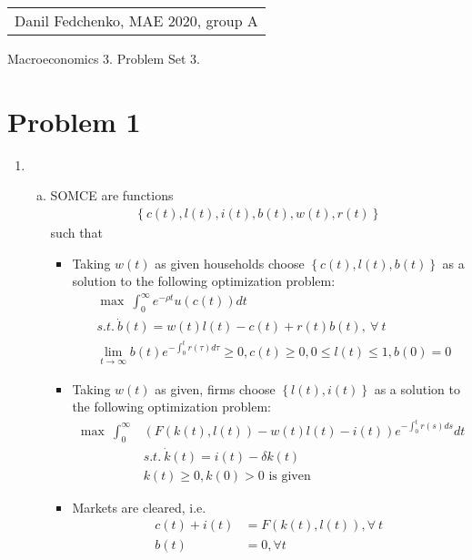 \documentclass[a4paper]{article}
\begin{document}
	\begin{flushright}
	\begin{tabular}{r}
		Danil Fedchenko, MAE 2020, group A \\
	\end{tabular}
\end{flushright}


\begin{center}
	Macroeconomics 3. Problem Set 3.
\end{center}
\section*{Problem 1}
\begin{enumerate}[1.]
	\item \begin{enumerate}[(a)]
		\item SOMCE are functions
		\begin{align*}
		\left\{c(t), l(t), i(t), b(t), w(t), r(t)\right\}
		\end{align*}
		such that
		\begin{itemize}
			\item Taking $w(t)$ as given households choose $\left\{c(t), l(t), b(t)\right\}$ as a solution to the following optimization problem:
			\begin{align*}
			&\max\ \int_{0}^{\infty} e^{-\rho t}u(c(t))dt\\
			&s.t.\ \dot{b}(t) = w(t)l(t) -c(t) + r(t)b(t),\ \forall\ t\\
			&\lim_{t \to \infty} b(t)e^{-\int_{0}^t r(\tau)d\tau} \ge 0, c(t) \ge 0, 0 \le l(t) \le 1, b(0) = 0
			\end{align*}
			\item Taking $w(t)$ as given, firms choose $\left\{l(t), i(t)\right\}$ as a solution to the following optimization problem:
			\begin{align*}
			\max\ \int_{0}^{\infty} &(F(k(t), l(t)) - w(t)l(t) - i(t))e^{-\int_0^tr(s)ds}dt\\
			&s.t.\ \dot{k}(t) = i(t) - \delta k(t)\\
			&k(t) \ge 0, k(0) > 0 \text{ is given}
			\end{align*}
			\item Markets are cleared, i.e.
			\begin{align*}
			c(t) + i(t) &= F(k(t), l(t)), \forall\ t\\
			b(t) &= 0, \forall t
			\end{align*}
		\end{itemize}

\end{enumerate}
\end{enumerate}
\end{document}
